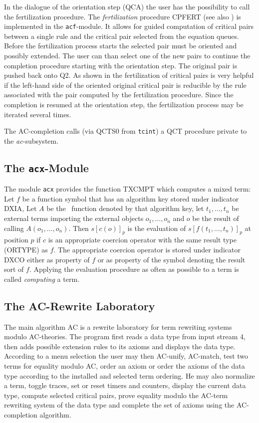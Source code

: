 In the dialogue of the orientation step (QCA) the user has the possibility to
call the fertilization procedure. 
The {\em fertilization} procedure CPFERT (see also \cite{Buendgen:91b}) is
implemented in the {\tt acf}-module.
It allows for guided computation of critical pairs between a single rule and 
the critical pair selected from the equation queues.
Before the fertilization process starts the selected pair must be oriented and
possibly extended.
The user can than select one of the new pairs to continue the 
completion procedure starting with the orientation step.
The original pair is pushed back onto Q2.
As shown in \cite{Buendgen:91b} the fertilization of critical pairs is very 
helpful if the left-hand side of the oriented original critical pair is
reducible by the rule associated with the pair computed by the
fertilization procedure.
Since the completion is resumed at the orientation step, the fertilization 
process may be iterated several times.

The AC-completion calls (via QCTS0 from {\tt tcint}) a QCT procedure private to
the {\it ac}-subsystem.

\subsection{The {\tt acx}-Module}

The module {\tt acx} provides the function TXCMPT which computes a
mixed term:
Let $f$ be a function symbol that has an algorithm key stored under indicator
DXIA, Let $A$ be the \ALDES\ function denoted by that algorithm key, 
let \( t_1, \ldots, t_n \) be external terms importing the external objects 
\( o_1, \ldots, o_n \) and $o$ be the result of calling $A(o_1, \ldots,o_n)$.
Then $s[c(o)]_p$ is the evaluation of $s[f(t_1,\ldots,t_n)]_p$ at position
$p$ if $c$ is an appropriate coercion operator with the same result type
(ORTYPE) as $f$. 
The appropriate coercion operator is stored under indicator DXCO
either as property of $f$ or as property of the symbol denoting
the result sort of $f$.
Applying the evaluation procedure as often as possible to a term
is called {\em computing} a term.

\subsection{The AC-Rewrite Laboratory}

The main algorithm AC is a rewrite laboratory for term rewriting systems
modulo AC-theories.
The program first reads a data type from input stream 4, 
then adds possible extension rules to its axioms and displays the data type.
According to a menu selection the user may then AC-unify, AC-match, 
test two terms for equality modulo AC, order an axiom or order the axioms
of the data type according to the installed and selected term ordering.
He may also normalize a term, toggle traces, set or reset timers and counters,
display the current data type,
compute selected critical pairs, prove equality modulo the AC-term rewriting
system of the data type and complete the set of axioms using the AC-completion
algorithm.
